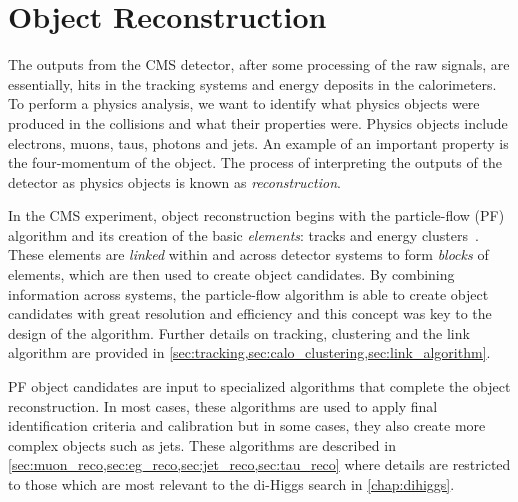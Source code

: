 \section{Object Reconstruction}\label{sec:reconstruction}
The outputs from the CMS detector, after some processing of the raw signals, are essentially, hits in the tracking systems and energy deposits in the calorimeters. To perform a physics analysis, we want to identify what physics objects were produced in the collisions and what their properties were. Physics objects include electrons, muons, taus, photons and jets. An example of an important property is the four-momentum of the object. The process of interpreting the outputs of the detector as physics objects is known as \textit{reconstruction}. 

In the CMS experiment, object reconstruction begins with the particle-flow (PF) algorithm and its creation of the basic \textit{elements}: tracks and energy clusters~\cite{CMS:2017yfk}. These elements are \textit{linked} within and across detector systems to form \textit{blocks} of elements, which are then used to create object candidates. By combining information across systems, the particle-flow algorithm is able to create object candidates with great resolution and efficiency and this concept was key to the design of the algorithm. Further details on tracking, clustering and the link algorithm are provided in \cref{sec:tracking,sec:calo_clustering,sec:link_algorithm}.

PF object candidates are input to specialized algorithms that complete the object reconstruction. In most cases, these algorithms are used to apply final identification criteria and calibration but in some cases, they also create more complex objects such as jets. These algorithms are described in \cref{sec:muon_reco,sec:eg_reco,sec:jet_reco,sec:tau_reco} where details are restricted to those which are most relevant to the di-Higgs search in \cref{chap:dihiggs}. 








